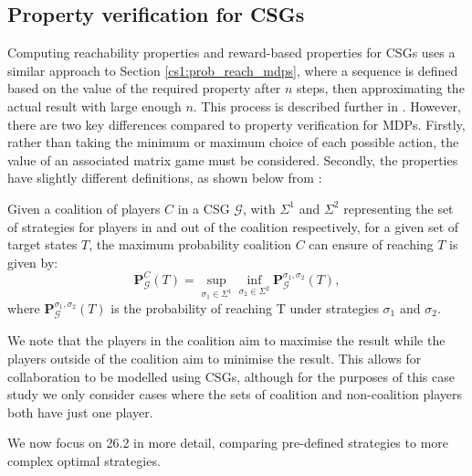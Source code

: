 
\subsection{Property verification for CSGs}
\label{cs3:prop_ver_csgs}

Computing reachability properties and reward-based properties for CSGs uses a similar approach to Section \ref{cs1:prob_reach_mdps}, where a sequence is defined based on the value of the required property after $n$ steps, then approximating the actual result with large enough $n$. This process is described further in \cite{kwiatkowska_automated_2018}. However, there are two key differences compared to property verification for MDPs. Firstly, rather than taking the minimum or maximum choice of each possible action, the value of an associated matrix game must be considered. Secondly, the properties have slightly different definitions, as shown below from \cite{kwiatkowska_verification_2019}:

\begin{definition}
    \label{cs3:csg_props}
    Given a coalition of players $C$ in a CSG $\mathcal{G}$, with $\Sigma^{1}$ and $\Sigma^{2}$ representing the set of strategies for players in and out of the coalition respectively, for a given set of target states $T$, the maximum probability coalition $C$ can ensure of reaching $T$ is given by:
    \begin{equation*}
        \mathbf{P}_{\mathcal{G}}^{C}(T) = \sup_{\sigma_1 \in \Sigma^{1}} \inf_{\sigma_2 \in \Sigma^{2}} \mathbf{P}_\mathcal{G}^{\sigma_1, \sigma_2}(T),
    \end{equation*}
    where $\mathbf{P}_\mathcal{G}^{\sigma_1, \sigma_2}(T)$ is the probability of reaching T under strategies $\sigma_1$ and $\sigma_2$.
\end{definition}
We note that the players in the coalition aim to maximise the result while the players outside of the coalition aim to minimise the result. This allows for collaboration to be modelled using CSGs, although for the purposes of this case study we only consider cases where the sets of coalition and non-coalition players both have just one player.

    
We now focus on 26.2 in more detail, comparing pre-defined strategies to more complex optimal strategies.

